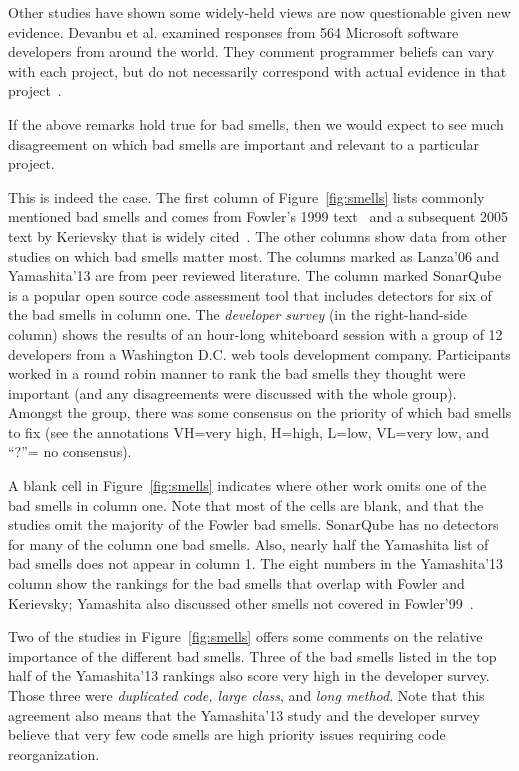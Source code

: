 \documentclass[twocolumn,5p]{elsarticle}
\newcommand{\fig}[1]{Figure~\ref{fig:#1}}
\theoremstyle{break}
\begin{document}
        Other 
	studies have shown some widely-held views are   now questionable given new 
	evidence.
	Devanbu et al. examined responses from 564 Microsoft software developers 
	from around
	the world. They comment programmer beliefs can vary with each project, but do not necessarily
	correspond with actual evidence in that project~\cite{prem16}.
	
	If the above remarks hold true for bad smells, then we would expect
	to see much disagreement on which bad smells are important and relevant
	to  a particular project.

        This is indeed the case.
	The first column of \fig{smells}
	lists  commonly mentioned bad smells and comes from Fowler's 1999 
	text~\cite{fowler99} and a subsequent 2005 text by Kerievsky that is widely 
	cited~\cite{Kerievsky2005}.
	The other
	columns show data from other studies on which bad smells matter most.
	The columns marked as Lanza'06 and Yamashita'13 are from peer reviewed 
	literature. The column marked SonarQube is a popular open source
	code assessment tool that includes detectors for six of the bad smells
	in column one.
	The {\em developer survey} (in the right-hand-side column) shows the 
	results of an hour-long whiteboard session with a group of 12 developers 
	from a Washington
	D.C. web tools development company. Participants
	worked in a round robin manner to rank the bad smells they thought were
	important (and any disagreements were discussed with the whole group).
	Amongst the group, there was  some
	consensus on  the priority of which bad smells to fix
	(see the annotations VH=very high,
	H=high, L=low, VL=very low, and ``?''= no consensus).
	
	
	
	
	
	A  blank cell in \fig{smells}
	indicates where   other work omits
	one of the bad smells in column one.
	Note that most of the cells are blank, and that the studies omit the 
	majority of the Fowler bad smells.
	SonarQube has no detectors for many of the column one bad smells.
	Also, nearly half the Yamashita list of bad smells
	does not appear in column 1. The eight numbers
	in the  Yamashita'13 column show the rankings for the bad smells
	that overlap with Fowler and Kerievsky; Yamashita also discussed other 
	smells not covered in Fowler'99~\cite{fowler99}.
	
	
	Two of the studies in \fig{smells} offers some comments on the relative 
	importance
	of the different bad smells. Three of the bad smells listed in the top 
	half 
	of the Yamashita'13 rankings also score very high in the developer survey. 
	Those three were {\em duplicated code, large class},
	and {\em long method}.
	Note that this agreement also means that the
	Yamashita'13 study and the developer survey
	believe
	that very few  code smells are   high priority issues
	requiring code reorganization.
	
\end{document}
